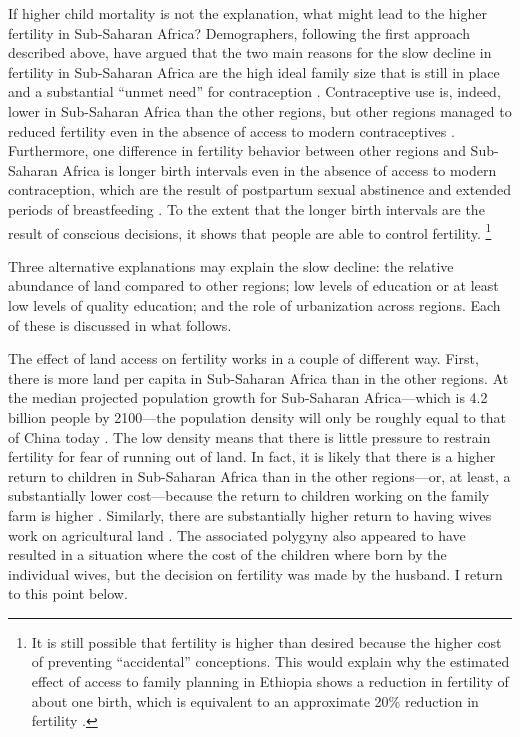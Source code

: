 \documentclass[letterpaper,12pt]{article}
\begin{document}
If higher child mortality is not the explanation, what might lead to the
higher fertility in Sub-Saharan Africa? Demographers, following the
first approach described above, have argued that the two main reasons
for the slow decline in fertility in Sub-Saharan Africa are the high
ideal family size that is still in place and a substantial ``unmet
need'' for contraception \citep{Bongaarts2013a,Singh2017}.
Contraceptive use is, indeed, lower in Sub-Saharan Africa than the other
regions, but other regions managed to reduced fertility even in the
absence of access to modern contraceptives
\citet{Schultz1985,Galloway1987,Bailey1998,bengtsson06}.
Furthermore, one difference in fertility behavior between other regions
and Sub-Saharan Africa is longer birth intervals even in the absence of
access to modern contraception, which are the result of postpartum
sexual abstinence and extended periods of breastfeeding
\citep{Caldwell1992}.
To the extent that the longer birth intervals are the result of
conscious decisions, it shows that people are able to control
fertility.%
\footnote{
It is still possible that fertility is higher than desired because the
higher cost of preventing ``accidental'' conceptions.
This would explain why the estimated effect of access to family planning
in Ethiopia shows a reduction in fertility of about one birth, which is
equivalent to an approximate 20\% reduction in fertility
\citet{Portner2014a}.}

Three alternative explanations may explain the slow decline: the
relative abundance of land compared to other regions; low levels of
education or at least low levels of quality education; and the role of
urbanization across regions.
Each of these is discussed in what follows.

The effect of land access on fertility works in a couple of different
way.
First, there is more land per capita in Sub-Saharan Africa than in the
other regions.
At the median projected population growth for Sub-Saharan Africa---which
is 4.2 billion people by 2100---the population density will only be
roughly equal to that of China today \citep[p 235]{Gerland2014}.
The low density means that there is little pressure to restrain
fertility for fear of running out of land.
In fact, it is likely that there is a higher return to children in
Sub-Saharan Africa than in the other regions---or, at least, a
substantially lower cost---because the return to children working on the
family farm is higher \citep{Caldwell1992}.
Similarly, there are substantially higher return to having wives work on
agricultural land \citep{jacoby95}.
The associated polygyny also appeared to have resulted in a situation
where the cost of the children where born by the individual wives, but
the decision on fertility was made by the husband.
I return to this point below.
\end{document}
